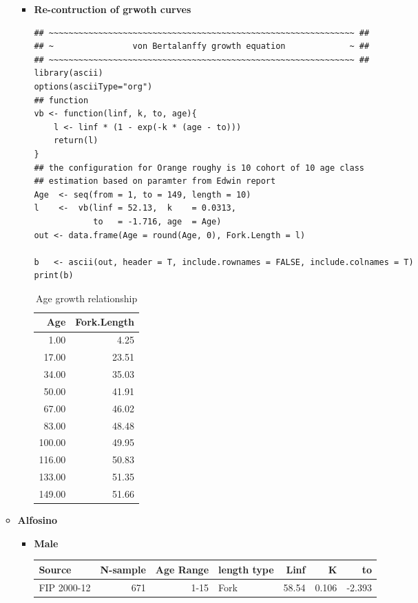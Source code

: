 \documentclass[11pt]{article}
\begin{document}
\begin{itemize}
\begin{itemize}
\begin{itemize}
\item \textbf{Re-contruction of grwoth curves}

\begin{verbatim}
## ~~~~~~~~~~~~~~~~~~~~~~~~~~~~~~~~~~~~~~~~~~~~~~~~~~~~~~~~~~~~~~ ##
## ~                von Bertalanffy growth equation             ~ ##
## ~~~~~~~~~~~~~~~~~~~~~~~~~~~~~~~~~~~~~~~~~~~~~~~~~~~~~~~~~~~~~~ ##
library(ascii)
options(asciiType="org")
## function
vb <- function(linf, k, to, age){
    l <- linf * (1 - exp(-k * (age - to)))
    return(l)
}
## the configuration for Orange roughy is 10 cohort of 10 age class
## estimation based on paramter from Edwin report
Age  <- seq(from = 1, to = 149, length = 10)
l    <-  vb(linf = 52.13,  k    = 0.0313,
            to   = -1.716, age  = Age)
out <- data.frame(Age = round(Age, 0), Fork.Length = l)

b   <- ascii(out, header = T, include.rownames = FALSE, include.colnames = T)
print(b)
\end{verbatim}
\begin{table}[htb]
\caption{Age growth relationship}
\begin{center}
\begin{tabular}{rr}
    Age  &  Fork.Length  \\
\hline
   1.00  &         4.25  \\
  17.00  &        23.51  \\
  34.00  &        35.03  \\
  50.00  &        41.91  \\
  67.00  &        46.02  \\
  83.00  &        48.48  \\
 100.00  &        49.95  \\
 116.00  &        50.83  \\
 133.00  &        51.35  \\
 149.00  &        51.66  \\
\end{tabular}
\end{center}
\end{table}

\end{itemize}
\item \textbf{Alfosino}
\begin{itemize}
\item \textbf{Male}

\begin{center}
\begin{tabular}{lrrlrrr}
 Source       &  N-sample  &  Age Range  &  length type  &   Linf  &      K  &      to  \\
\hline
 FIP 2000-12  &       671  &       1-15  &  Fork         &  58.54  &  0.106  &  -2.393  \\
\end{tabular}
\end{center}



\end{itemize}
\end{itemize}
\end{itemize}
\end{document}
